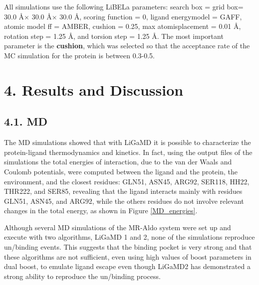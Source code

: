\documentclass[
  journal=usp, %
  manuscript=final-report,
  year=2023,
  volume=1,
]{cup-journal}
\begin{document}
All simulations use the following LiBELa parameters: search box = grid box= 30.0 \AA $\times$ 30.0 \AA $\times$ 30.0 \AA, scoring function = 0, ligand energymodel = GAFF, atomic model ff = AMBER, cushion = 0.25, max atomisplacement = 0.01 \AA, rotation step = 1.25 \AA, and torsion step = 1.25 \AA. The  most important parameter is the \textbf{cushion}, which was selected so that the acceptance rate of the MC simulation for the protein is between 0.3-0.5. 

\section{4. Results and Discussion}


\subsection{4.1. MD}




The MD simulations showed that with LiGaMD it is possible to characterize the protein-ligand thermodynamics and kinetics. In fact, using the output files of the simulations the total energies of interaction, due to the van der Waals and Coulomb potentials, were computed between the ligand and the protein, the environment, and the closest residues: GLN51, ASN45, ARG92, SER118, HH22, THR222, and SER85, revealing that the ligand interacts mainly with residues GLN51, ASN45, and ARG92, while the others residues do not involve relevant changes in the total energy, as shown in Figure \ref{MD_energies}.

Although several MD simulations of the MR-Aldo system were set up and execute with two algorithms, LiGaMD 1 and 2, none of the simulations reproduce un/binding events. This suggests that the binding pocket is very strong and that these algorithms are not sufficient, even using high values of boost parameters in dual boost, to emulate ligand escape even though LiGaMD2 has demonstrated a strong ability to reproduce the un/binding process. 
\end{document}
